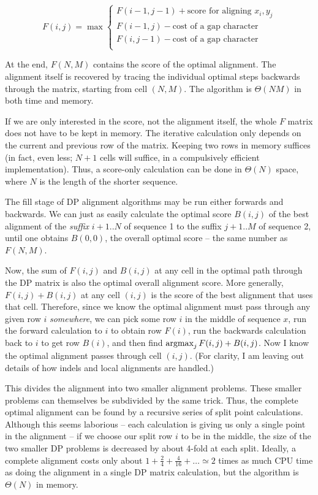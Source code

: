 \documentclass[11pt]{article}
\def\argmax{\mathop{\mathrm{argmax}}\limits}
\begin{document}
\[  F(i,j) = \max \left\{ \begin{array}{l}
                       F(i-1,j-1) + \mbox{score for aligning $x_i, y_j$} \\
                       F(i-1,j) - \mbox{cost of a gap character} \\
                       F(i,j-1) - \mbox{cost of a gap character} \\
                       \end{array} \right. \]

At the end, $F(N,M)$ contains the score of the optimal alignment. The
alignment itself is recovered by tracing the individual optimal steps
backwards through the matrix, starting from cell $(N,M)$. The
algorithm is $\Theta(NM)$ in both time and memory.

If we are only interested in the score, not the alignment itself, the
whole $F$ matrix does not have to be kept in memory. The iterative
calculation only depends on the current and previous row of the
matrix. Keeping two rows in memory suffices (in fact, even less; $N+1$
cells will suffice, in a compulsively efficient implementation). Thus,
a score-only calculation can be done in $\Theta(N)$ space, where $N$
is the length of the shorter sequence.

The fill stage of DP alignment algorithms may be run either forwards
and backwards. We can just as easily calculate the optimal score
$B(i,j)$ of the best alignment of the \emph{suffix} $i+1..N$ of
sequence 1 to the suffix $j+1..M$ of sequence 2, until one obtains
$B(0,0)$, the overall optimal score -- the same number as $F(N,M)$.

Now, the sum of $F(i,j)$ and $B(i,j)$ at any cell in the optimal path
through the DP matrix is also the optimal overall alignment score.
More generally, $F(i,j) + B(i,j)$ at any cell $(i,j)$ is the score of
the best alignment that uses that cell. Therefore, since we know the
optimal alignment must pass through any given row $i$
\emph{somewhere}, we can pick some row $i$ in the middle of sequence
$x$, run the forward calculation to $i$ to obtain row $F(i)$, run the
backwards calculation back to $i$ to get row $B(i)$, and then find
$\argmax\nolimits_j F(i,j) + B(i,j)$. Now I know the optimal alignment
passes through cell $(i,j)$. (For clarity, I am leaving out details of
how indels and local alignments are handled.)

This divides the alignment into two smaller alignment problems. These
smaller problems can themselves be subdivided by the same trick.
Thus, the complete optimal alignment can be found by a recursive
series of split point calculations. Although this seems laborious --
each calculation is giving us only a single point in the alignment --
if we choose our split row $i$ to be in the middle, the size of the
two smaller DP problems is decreased by about 4-fold at each
split. Ideally, a complete alignment costs only about $1 + \frac{2}{4}
+ \frac{4}{16} + \ldots \simeq 2$ times as much CPU time as doing the
alignment in a single DP matrix calculation, but the algorithm is
$\Theta(N)$ in memory.
\end{document}
